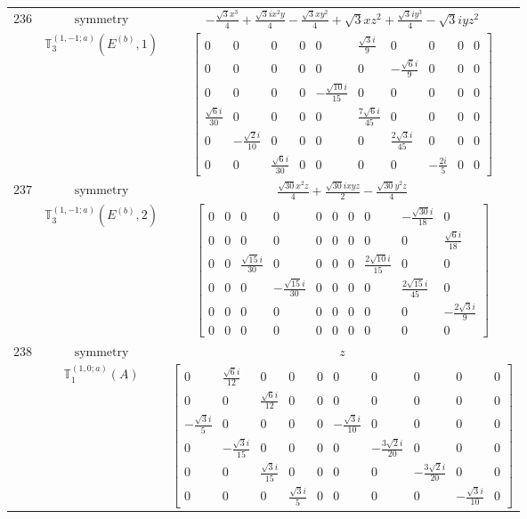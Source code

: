 \documentclass[fleqn,8pt,landscape]{jsarticle}
\begin{document}
\begin{longtable}{ccc}
$ 236 $ & $ \text{symmetry} $ & $ - \frac{\sqrt{3} x^{3}}{4} + \frac{\sqrt{3} i x^{2} y}{4} - \frac{\sqrt{3} x y^{2}}{4} + \sqrt{3} x z^{2} + \frac{\sqrt{3} i y^{3}}{4} - \sqrt{3} i y z^{2} $ \\
$  $ & $ \mathbb{T}_{3}^{(1,-1;a)}(E^{(b)},1) $ & $ \begin{bmatrix} 0 & 0 & 0 & 0 & 0 & \frac{\sqrt{3} i}{9} & 0 & 0 & 0 & 0 \\ 0 & 0 & 0 & 0 & 0 & 0 & - \frac{\sqrt{6} i}{9} & 0 & 0 & 0 \\ 0 & 0 & 0 & 0 & - \frac{\sqrt{10} i}{15} & 0 & 0 & 0 & 0 & 0 \\ \frac{\sqrt{6} i}{30} & 0 & 0 & 0 & 0 & \frac{7 \sqrt{6} i}{45} & 0 & 0 & 0 & 0 \\ 0 & - \frac{\sqrt{2} i}{10} & 0 & 0 & 0 & 0 & \frac{2 \sqrt{3} i}{45} & 0 & 0 & 0 \\ 0 & 0 & \frac{\sqrt{6} i}{30} & 0 & 0 & 0 & 0 & - \frac{2 i}{5} & 0 & 0 \end{bmatrix} $ \\ \hline
$ 237 $ & $ \text{symmetry} $ & $ \frac{\sqrt{30} x^{2} z}{4} + \frac{\sqrt{30} i x y z}{2} - \frac{\sqrt{30} y^{2} z}{4} $ \\
$  $ & $ \mathbb{T}_{3}^{(1,-1;a)}(E^{(b)},2) $ & $ \begin{bmatrix} 0 & 0 & 0 & 0 & 0 & 0 & 0 & 0 & - \frac{\sqrt{30} i}{18} & 0 \\ 0 & 0 & 0 & 0 & 0 & 0 & 0 & 0 & 0 & \frac{\sqrt{6} i}{18} \\ 0 & 0 & \frac{\sqrt{15} i}{30} & 0 & 0 & 0 & 0 & \frac{2 \sqrt{10} i}{15} & 0 & 0 \\ 0 & 0 & 0 & - \frac{\sqrt{15} i}{30} & 0 & 0 & 0 & 0 & \frac{2 \sqrt{15} i}{45} & 0 \\ 0 & 0 & 0 & 0 & 0 & 0 & 0 & 0 & 0 & - \frac{2 \sqrt{3} i}{9} \\ 0 & 0 & 0 & 0 & 0 & 0 & 0 & 0 & 0 & 0 \end{bmatrix} $ \\ \hline
$ 238 $ & $ \text{symmetry} $ & $ z $ \\
$  $ & $ \mathbb{T}_{1}^{(1,0;a)}(A) $ & $ \begin{bmatrix} 0 & \frac{\sqrt{6} i}{12} & 0 & 0 & 0 & 0 & 0 & 0 & 0 & 0 \\ 0 & 0 & \frac{\sqrt{6} i}{12} & 0 & 0 & 0 & 0 & 0 & 0 & 0 \\ - \frac{\sqrt{3} i}{5} & 0 & 0 & 0 & 0 & - \frac{\sqrt{3} i}{10} & 0 & 0 & 0 & 0 \\ 0 & - \frac{\sqrt{3} i}{15} & 0 & 0 & 0 & 0 & - \frac{3 \sqrt{2} i}{20} & 0 & 0 & 0 \\ 0 & 0 & \frac{\sqrt{3} i}{15} & 0 & 0 & 0 & 0 & - \frac{3 \sqrt{2} i}{20} & 0 & 0 \\ 0 & 0 & 0 & \frac{\sqrt{3} i}{5} & 0 & 0 & 0 & 0 & - \frac{\sqrt{3} i}{10} & 0 \end{bmatrix} $ \\ \hline

\end{longtable}
\end{document}
